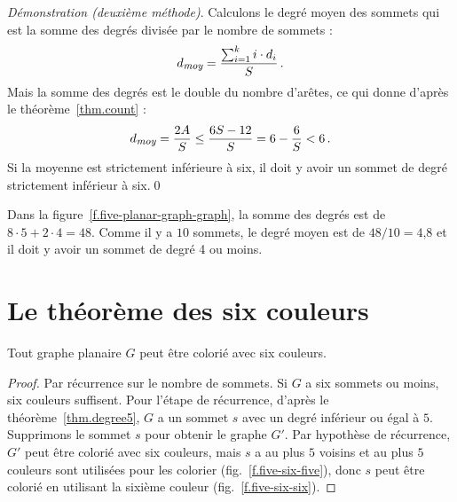 \medskip 

\noindent  \emph{Démonstration (deuxième méthode)}. 
Calculons le degré moyen des sommets qui est la somme des degrés divisée par le nombre de sommets :
\[
d_{\textit{\footnotesize moy}}=\frac{\sum_{i=1}^{k} i\cdot d_i}{S}\,.
\]
Mais la somme des degrés est le double du nombre d'arêtes, ce qui donne d'après le  théorème~\ref{thm.count} :
\[
d_{\textit{\footnotesize moy}}=\frac{2A}{S}\leq \frac{6S-12}{S}=6-\frac{6}{S}<6\,.
\]
Si la moyenne est strictement inférieure à six, il doit y avoir un sommet de degré strictement  inférieur à six.\qed

\begin{example}
Dans la figure~\ref{f.five-planar-graph-graph}, la somme des degrés est de $8\cdot 5 + 2\cdot 4=48$. Comme il y a $10$ sommets, le degré moyen est de $48/10=\mbox{4,8}$ et il doit y avoir un sommet de degré 4 ou moins.
\end{example}

\section{Le théorème des six couleurs}\label{s.six-color}

\begin{theorem}\label{thm.sixcolor}
Tout graphe planaire $G$ peut être colorié avec six couleurs.
\end{theorem}
\begin{proof}
Par récurrence sur le nombre de sommets. Si $G$ a six sommets ou moins, six couleurs suffisent.
Pour l'étape de récurrence, d'après le théorème~\ref{thm.degree5}, $G$ a un sommet $s$ avec un degré inférieur ou égal à $5$. Supprimons le sommet $s$ pour obtenir le graphe $G'$. Par hypothèse de récurrence, $G'$ peut être colorié avec six couleurs, mais $s$ a au plus $5$ voisins et au plus $5$ couleurs sont utilisées pour les colorier (fig.~\ref{f.five-six-five}), donc $s$ peut être colorié en utilisant la sixième couleur (fig.~\ref{f.five-six-six}).
\end{proof}

\vspace{0.2cm}

